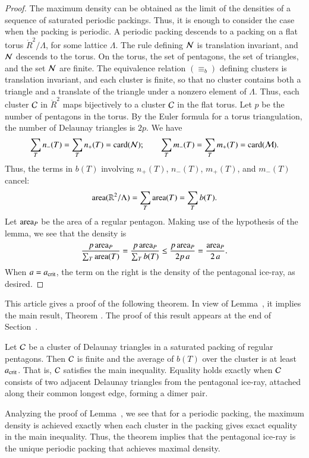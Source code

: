 \begin{proof} The maximum density can be obtained as the limit of the
  densities of a sequence of saturated periodic packings.  Thus, it is
  enough to consider the case when the packing is periodic.  A
  periodic packing descends to a packing on a flat torus
  $\ring{R}^2/\Lambda$, for some lattice $\Lambda$.  The rule defining
  $\mathcal N$ is translation invariant, and $\mathcal N$ descends to the torus.  On
  the torus, the set of pentagons, the set of triangles, and the set
  $\mathcal N$ are finite.  The equivalence relation $(\equiv_b)$ defining
  clusters is translation invariant, and each cluster is finite, so
  that no cluster contains both a triangle and a translate of the
  triangle under a nonzero element of $\Lambda$.  Thus, each cluster
  $\mathcal C$ in $\ring{R}^2$ maps bijectively to a cluster $\mathcal C$ in the flat
  torus.  Let $p$ be the number of pentagons in the torus.  By the
  Euler formula for a torus triangulation, the number of Delaunay
  triangles is $2p$.  We have
\[
\sum_{T} n_-(T) =  \sum_{T} n_+(T) = {\operatorname{card}}(\mathcal N);\qquad
\sum_{T} m_-(T) =  \sum_{T} m_+(T) = {\operatorname{card}}(\mathcal M).
\]
Thus, the terms in $b(T)$ involving $n_+(T)$, $n_-(T)$, $m_+(T)$,
and $m_-(T)$ cancel:
\[
{\operatorname{area}}(\mathbb{R}^2/\Lambda) = \sum_T {\operatorname{area}}(T) = \sum_T b(T).
\]    
Let ${\operatorname{area}}_P$ be the area of a regular pentagon.  Making use of the
hypothesis of the lemma, we see that the density is
\[
\frac{p\, {\operatorname{area}}_P}{\sum_T {\operatorname{area}}(T)} 
=\frac{p\, {\operatorname{area}}_P}{\sum_T b(T)} \le\frac{p\, {\operatorname{area}}_P}{2 p\, a} 
= \frac{{\operatorname{area}}_P}{2\, a}.
\]
When $a=a_\text{crit}$, the term on the right is the density of the
pentagonal ice-ray, as desired.
\end{proof}

This article gives a proof of the following theorem. In view of
Lemma~, it implies the main result, Theorem
.  The proof of this result appears at the end of
Section~.

\begin{theorem}
  Let $\mathcal C$ be a cluster of Delaunay triangles in a saturated
  packing of regular pentagons.  Then $\mathcal C$ is finite and the average
  of $b(T)$ over the cluster is at least $a_\text{crit}$.  That is, $\mathcal C$
  satisfies the main inequality.  Equality holds exactly when $\mathcal C$
  consists of two adjacent Delaunay triangles from the pentagonal ice-ray, 
attached along their common longest edge, forming a dimer pair.
\end{theorem}

\begin{remark}
Analyzing the proof of Lemma~, we see that for a
periodic packing, the maximum density is achieved exactly when each
 cluster in the packing gives exact equality in the main inequality.
Thus, the theorem implies that the pentagonal ice-ray  is the
unique periodic packing that achieves maximal density.
\end{remark}



